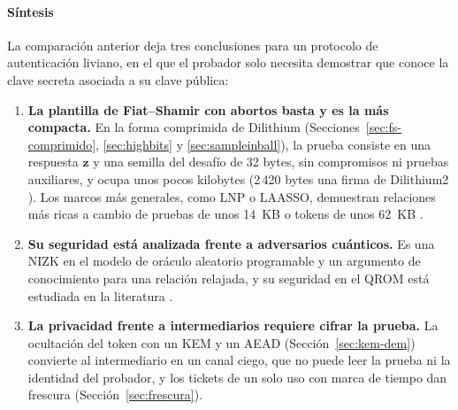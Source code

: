 \paragraph{Síntesis}
\label{sec:sintesis-zkp}
La comparación anterior deja tres conclusiones para un protocolo de autenticación liviano, en el que el probador solo necesita demostrar que conoce la clave secreta asociada a su clave pública:
\begin{enumerate}
    \item \textbf{La plantilla de Fiat--Shamir con abortos basta y es la más compacta.} En la forma comprimida de Dilithium (Secciones~\ref{sec:fs-comprimido}, \ref{sec:highbits} y \ref{sec:sampleinball}), la prueba consiste en una respuesta $\mathbf{z}$ y una semilla del desafío de 32 bytes, sin compromisos ni pruebas auxiliares, y ocupa unos pocos kilobytes (2\,420 bytes una firma de Dilithium2 \cite{bai2021dilithium}). Los marcos más generales, como LNP o LAASSO, demuestran relaciones más ricas a cambio de pruebas de unos 14~KB o tokens de unos 62~KB \cite{lyubashevsky2022lattice, ma2026laasso}.
    \item \textbf{Su seguridad está analizada frente a adversarios cuánticos.} Es una NIZK en el modelo de oráculo aleatorio programable y un argumento de conocimiento para una relación relajada, y su seguridad en el QROM está estudiada en la literatura \cite{liu2019revisiting, kiltz2018concrete, devevey2023detailed, barbosa2023fixing}.
    \item \textbf{La privacidad frente a intermediarios requiere cifrar la prueba.} La ocultación del token con un KEM y un AEAD (Sección~\ref{sec:kem-dem}) convierte al intermediario en un canal ciego, que no puede leer la prueba ni la identidad del probador, y los tickets de un solo uso con marca de tiempo dan frescura (Sección~\ref{sec:frescura}).
\end{enumerate}

